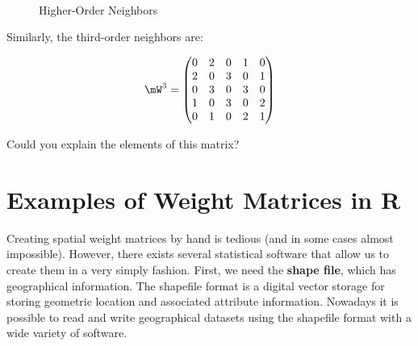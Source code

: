 \begin{figure}[ht]
\caption{Higher-Order Neighbors}
\label{fig:example_hon}
\centering
{}
\\
\vspace{1cm}
\end{figure}

Similarly, the third-order neighbors are: 


\begin{equation*}
\mW^3 = \begin{pmatrix}
      0 & 2 & 0 & 1 & 0 \\
      2 & 0 & 3 & 0 & 1 \\
      0 & 3 & 0 & 3 & 0 \\
      1 & 0 & 3 & 0 & 2 \\
      0 & 1 & 0 & 2 & 1
      \end{pmatrix}
\end{equation*}

Could you explain the elements of this matrix?


\section{Examples of Weight Matrices in R}

Creating spatial weight matrices by hand is tedious (and in some cases almost impossible). However, there exists several statistical software that allow us to create them in a very simply fashion.  First, we need the \textbf{shape file}, which has geographical information.  The shapefile format is a digital vector storage for storing geometric location and associated attribute information. Nowadays it is possible to read and write geographical datasets using the shapefile format with a wide variety of software.

